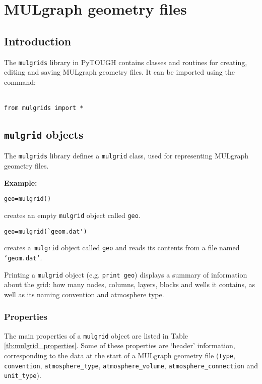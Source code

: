 \chapter{MULgraph geometry files}
\label{mulgrids}

\section{Introduction}
The \texttt{mulgrids} library in PyTOUGH contains classes and routines for creating, editing and saving MULgraph geometry files.  It can be imported using the command:

 \texttt{\\
   from mulgrids import *}

\section{\texttt{mulgrid} objects}

The \texttt{mulgrids} library defines a \texttt{mulgrid} class, used for representing MULgraph geometry files.

\textbf{Example:}

\begin{verbatim}
geo=mulgrid()
\end{verbatim}

creates an empty \texttt{mulgrid} object called \texttt{geo}.

\begin{verbatim}
geo=mulgrid(`geom.dat')
\end{verbatim}

creates a \texttt{mulgrid} object called \texttt{geo} and reads its contents from a file named \texttt{`geom.dat'}.

Printing a \texttt{mulgrid} object (e.g. \texttt{print geo}) displays a summary of information about the grid: how many nodes, columns, layers, blocks and wells it contains, as well as its naming convention and atmosphere type.

\subsection{Properties}

The main properties of a \texttt{mulgrid} object are listed in Table \ref{tb:mulgrid_properties}.  Some of these properties are `header' information, corresponding to the data at the start of a MULgraph geometry file (\texttt{type}, \texttt{convention}, \texttt{atmosphere\_type}, \texttt{atmosphere\_volume}, \texttt{atmosphere\_connection} and \texttt{unit\_type}).

